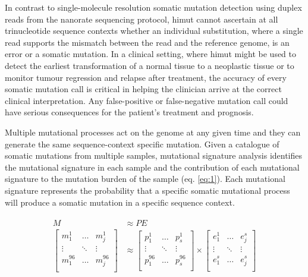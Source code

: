 In contrast to single-molecule resolution somatic mutation detection using duplex reads from the nanorate sequencing protocol, himut cannot ascertain at all trinucleotide sequence contexts whether an individual substitution, where a single read supports the mismatch between the read and the reference genome, is an error or a somatic mutation. In a clinical setting, where himut might be used to detect the earliest transformation of a normal tissue to a neoplastic tissue or to monitor tumour regression and relapse after treatment, the accuracy of every somatic mutation call is critical in helping the clinician arrive at the correct clinical interpretation. Any false-positive or false-negative mutation call could have serious consequences for the patient’s treatment and prognosis. 
 
Multiple mutational processes act on the genome at any given time and they can generate the same sequence-context specific mutation. Given a catalogue of somatic mutations from multiple samples, mutational signature analysis identifies the mutational signature in each sample and the contribution of each mutational signature to the mutation burden of the sample (eq. \ref{eq:1}). Each mutational signature represents the probability that a specific somatic mutational process will produce a somatic mutation in a specific sequence context. 

\begin{align}
\begin{split} 
M &\approx PE \label{eq:1} \\
\begin{bmatrix}
    m^{1}_{1} & \dots & m^{1}_{j} \\
    \vdots & \ddots & \vdots \\
    m^{96}_{1} & \dots & m^{96}_{j} \\
\end{bmatrix} &\approx
\begin{bmatrix}
    p^{1}_{1} & \dots & p^{1}_{s} \\
    \vdots & \ddots & \vdots \\
    p^{96}_{1} & \dots & p^{96}_{s} \\
\end{bmatrix} \times
\begin{bmatrix}
    e^{1}_{1} & \dots & e^{s}_{j} \\
    \vdots & \ddots & \vdots \\
    e^{s}_{1} & \dots & e^{s}_{j} \\
\end{bmatrix} 
\end{split}
\end{align}

